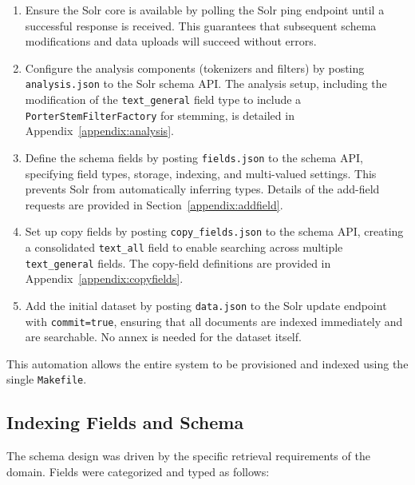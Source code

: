 \begin{enumerate}
    \item Ensure the Solr core is available by polling the Solr ping endpoint until a successful response is received. This guarantees that subsequent schema modifications and data uploads will succeed without errors.

    \item Configure the analysis components (tokenizers and filters) by posting \texttt{analysis.json} to the Solr schema API. The analysis setup, including the modification of the \texttt{text\_general} field type to include a \texttt{PorterStemFilterFactory} for stemming, is detailed in Appendix~\ref{appendix:analysis}.

    \item Define the schema fields by posting \texttt{fields.json} to the schema API, specifying field types, storage, indexing, and multi-valued settings. This prevents Solr from automatically inferring types. Details of the add-field requests are provided in Section~\ref{appendix:addfield}.

    \item Set up copy fields by posting \texttt{copy\_fields.json} to the schema API, creating a consolidated \texttt{text\_all} field to enable searching across multiple \texttt{text\_general} fields. The copy-field definitions are provided in Appendix~\ref{appendix:copyfields}.

    \item Add the initial dataset by posting \texttt{data.json} to the Solr update endpoint with \texttt{commit=true}, ensuring that all documents are indexed immediately and are searchable. No annex is needed for the dataset itself.

\end{enumerate}


This automation allows the entire system to be provisioned and indexed using the single \texttt{Makefile}.

\subsection{Indexing Fields and Schema}

The schema design was driven by the specific retrieval requirements of the domain. Fields were categorized and typed as follows:

